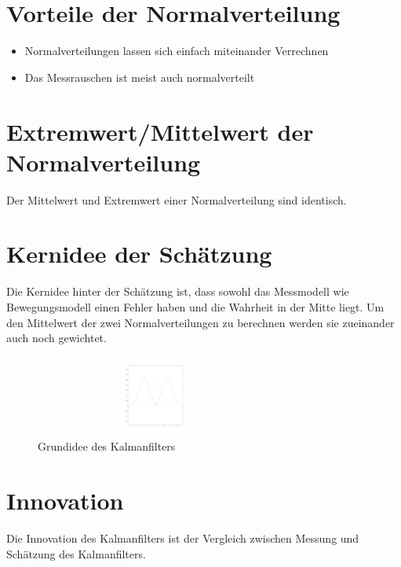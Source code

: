 \section{Vorteile der Normalverteilung}
\begin{itemize}
	\item Normalverteilungen lassen sich einfach miteinander Verrechnen
	\item Das Messrauschen ist meist auch normalverteilt
\end{itemize}

\section{Extremwert/Mittelwert der Normalverteilung}
Der Mittelwert und Extremwert einer Normalverteilung sind identisch.

\section{Kernidee der Schätzung}
Die Kernidee hinter der Schätzung ist, dass sowohl das Messmodell wie Bewegungsmodell einen Fehler haben und die Wahrheit in der Mitte liegt. Um den Mittelwert der zwei Normalverteilungen zu berechnen werden sie zueinander auch noch gewichtet. 

\begin{figure}[!ht]
	
	\begin{center}                                      
		
		\includegraphics[width=0.7\textwidth, height=100px]{normal_distributions.pdf}                                                                  
		
	\end{center}
	\caption{Grundidee des Kalmanfilters}
	\label{fig:kernideeKalman}
	
\end{figure}

\section{Innovation}
Die Innovation des Kalmanfilters ist der Vergleich zwischen Messung und Schätzung des Kalmanfilters. 

